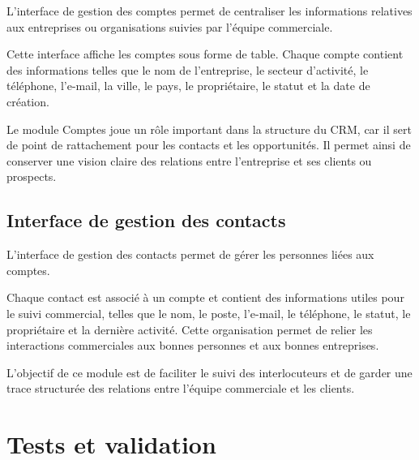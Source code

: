 \documentclass[12pt,a4paper]{report}
\begin{document}
L’interface de gestion des comptes permet de centraliser les informations relatives aux entreprises ou organisations suivies par l’équipe commerciale.


Cette interface affiche les comptes sous forme de table. Chaque compte contient des informations telles que le nom de l’entreprise, le secteur d’activité, le téléphone, l’e-mail, la ville, le pays, le propriétaire, le statut et la date de création.

Le module Comptes joue un rôle important dans la structure du CRM, car il sert de point de rattachement pour les contacts et les opportunités. Il permet ainsi de conserver une vision claire des relations entre l’entreprise et ses clients ou prospects.

\subsection{Interface de gestion des contacts}

L’interface de gestion des contacts permet de gérer les personnes liées aux comptes.


Chaque contact est associé à un compte et contient des informations utiles pour le suivi commercial, telles que le nom, le poste, l’e-mail, le téléphone, le statut, le propriétaire et la dernière activité. Cette organisation permet de relier les interactions commerciales aux bonnes personnes et aux bonnes entreprises.

L’objectif de ce module est de faciliter le suivi des interlocuteurs et de garder une trace structurée des relations entre l’équipe commerciale et les clients.

\section{Tests et validation}
\end{document}
